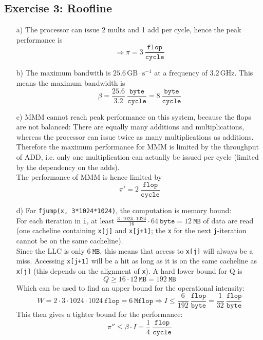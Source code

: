 \documentclass[11pt]{article}
\newcommand{\unit}[1]{\ensuremath{\, \mathrm{#1}}}			%
\newcommand{\type}{~\mathtt}
\begin{document}
\subsection*{Exercise 3: Roofline}
	\begin{itemize}
		\item[a)] The processor can issue 2 mults and 1 add per cycle, hence the peak performance is
		\[ \Rightarrow \pi = 3 \type{\frac{flop}{cycle}} \]
		\item[b)] The maximum bandwith is $25.6 \unit{GB \cdot s^{-1}}$ at a frequency of $3.2 \unit{GHz}$. This means the maximum bandwidth is
		\[ \beta = \frac{25.6}{3.2} \type{\frac{byte}{cycle}} = 8 \type{\frac{byte}{cycle}}  \]
		\item[c)] MMM cannot reach peak performance on this system, because the flops are not balanced: There are equally many additions and multiplications, whereas the processor can issue twice as many multiplications as additions. Therefore the maximum performance for MMM is limited by the throughput of ADD, i.e. only one multiplication can actually be issued per cycle (limited by the dependency on the adds).\\
		The performance of MMM is hence limited by 
		\[ \pi' = 2 \type{\frac{flop}{cycle}} \]
		\item[d)]
		For \texttt{fjump(x, 3*1024*1024)}, the computation is memory bound:\\
		For each iteration in \texttt{i}, at least $\frac{3\cdot1024\cdot1024}{16} \cdot 64 \type{byte} = 12 \type{MB}$ of data are read (one cacheline containing \texttt{x[j]} and \texttt{x[j+1]}; the \texttt{x} for the next \texttt{j}-iteration cannot be on the same cacheline).\\
		Since the LLC is only $6 \type{MB}$, this means that access to \texttt{x[j]} will always be a miss. Accessing \texttt{x[j+1]} will be a hit as long as it is on the same cacheline as \texttt{x[j]} (this depends on the alignment of \texttt{x}). A hard lower bound for Q is 
		\[ Q \geq 16 \cdot 12 \type{MB} =  192 \type{MB} \] 
		Which can be used to find an upper bound for the operational intensity:
		\[ W = 2 \cdot 3 \cdot 1024 \cdot 1024 \type{flop} = 6 \type{Mflop} \Rightarrow I \leq \frac{6}{192} \type{\frac{flop}{byte}} = \frac{1}{32} \type{\frac{flop}{byte}} \]
		This then gives a tighter bound for the performance: 
		\[ \pi'' \leq \beta \cdot I = \frac{1}{4} \type{\frac{flop}{cycle}}  \]
		\begin{figure}[H]\centering

\end{figure}
\end{itemize}
\end{document}
